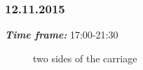 \subsubsection{12.11.2015}
\textit{\textbf{Time frame:}} 17:00-21:30 \newline


  	\begin{figure}[H]
  		\begin{minipage}[h]{1\linewidth}
  			\caption{two sides of the carriage}
  		\end{minipage}
  	\end{figure}
  	
